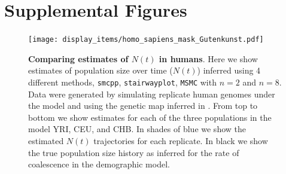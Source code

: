 \documentclass[12pt,halfline,a4paper]{ouparticle}
\newcommand{\beginsupplement}{%
        \setcounter{table}{0}
        \renewcommand{\thetable}{S\arabic{table}}%
        \setcounter{figure}{0}
        \renewcommand{\thefigure}{S\arabic{figure}}%
     }
\newcommand{\MSMC}{\texttt{MSMC}\xspace}
\newcommand{\smcpp}{\texttt{smcpp}\xspace}
\newcommand{\stairwayplot}{\texttt{stairwayplot}\xspace}
\begin{document}






\pagebreak
\beginsupplement
\section*{Supplemental Figures}
\begin{figure}
\begin{center}
\texttt{[image: display\_items/homo\_sapiens\_mask\_Gutenkunst.pdf]}
\caption{\textbf{Comparing estimates of $N(t)$ in humans}. Here we show estimates of population
size over time ($N(t)$) inferred using 4 different methods, \smcpp, \stairwayplot,
\MSMC with $n=2$ and $n=8$. Data were generated by simulating
replicate human genomes under the \cite{gutenkunst2009inferring} model and using the genetic map
inferred in \cite{international2007second}. From top to bottom we show estimates for each
of the three populations in the model YRI, CEU, and CHB. In shades of blue we show the estimated
$N(t)$ trajectories for each replicate. In black we show the true population size history as inferred
for the rate of coalescence in the demographic model.}
\label{fig:n_t_gutenkunst}
\end{center}
\end{figure}
\end{document}
